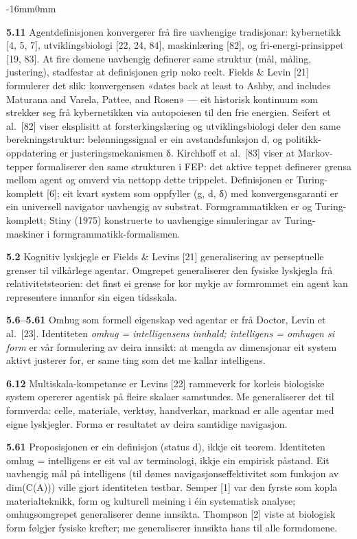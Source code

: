 \documentclass[10pt,oneside]{book}
\newcommand{\msym}[1]{{\mathfbfont #1}}
\newenvironment{widebody}{%
  \begin{adjustwidth}{-16mm}{0mm}%
}{%
  \end{adjustwidth}%
}
\begin{document}
\begin{widebody}
{\textbf{5.11} Agentdefinisjonen konvergerer frå fire uavhengige tradisjonar: kybernetikk [4, 5, 7], utviklingsbiologi [22, 24, 84], maskinlæring [82], og fri-energi-prinsippet [19, 83]. At fire domene uavhengig definerer same struktur (mål, måling, justering), stadfestar at definisjonen grip noko reelt. Fields \& Levin [21] formulerer det slik: konvergensen «dates back at least to Ashby, and includes Maturana and Varela, Pattee, and Rosen» --- eit historisk kontinuum som strekker seg frå kybernetikken via autopoiesen til den frie energien. Seifert et al.\ [82] viser eksplisitt at forsterkingslæring og utviklingsbiologi deler den same berekningstruktur: belønningssignal er ein avstandsfunksjon d, og politikk-oppdatering er justeringsmekanismen δ. Kirchhoff et al.\ [83] viser at Markov-tepper formaliserer den same strukturen i FEP: det aktive teppet definerer grensa mellom agent og omverd via nettopp dette trippelet. Definisjonen er Turing-komplett [6]; eit kvart system som oppfyller (g, d, \msym{δ}) med konvergensgaranti er ein universell navigator uavhengig av substrat. Formgrammatikken er og Turing-komplett; Stiny (1975) konstruerte to uavhengige simuleringar av Turing-maskiner i formgrammatikk-formalismen.

\textbf{5.2} Kognitiv lyskjegle er Fields \& Levins [21] generalisering av perseptuelle grenser til vilkårlege agentar. Omgrepet generaliserer den fysiske lyskjegla frå relativitetsteorien: det finst ei grense for kor mykje av formrommet ein agent kan representere innanfor sin eigen tidsskala.

\textbf{5.6--5.61} Omhug som formell eigenskap ved agentar er frå Doctor, Levin et al.\ [23]. Identiteten \textit{omhug = intelligensens innhald; intelligens = omhugen si form} er vår formulering av deira innsikt: at mengda av dimensjonar eit system aktivt justerer for, er same ting som det me kallar intelligens.

\textbf{6.12} Multiskala-kompetanse er Levins [22] rammeverk for korleis biologiske system opererer agentisk på fleire skalaer samstundes. Me generaliserer det til formverda: celle, materiale, verktøy, handverkar, marknad er alle agentar med eigne lyskjegler. Forma er resultatet av deira samtidige navigasjon.

\textbf{5.61} Proposisjonen er ein definisjon (status d), ikkje eit teorem. Identiteten omhug = intelligens er eit val av terminologi, ikkje ein empirisk påstand. Eit uavhengig mål på intelligens (til dømes navigasjonseffektivitet som funksjon av dim(C(A))) ville gjort identiteten testbar. Semper [1] var den fyrste som kopla materialteknikk, form og kulturell meining i éin systematisk analyse; omhugsomgrepet generaliserer denne innsikta. Thompson [2] viste at biologisk form følgjer fysiske krefter; me generaliserer innsikta hans til alle formdomene.

}
\end{widebody}
\end{document}
